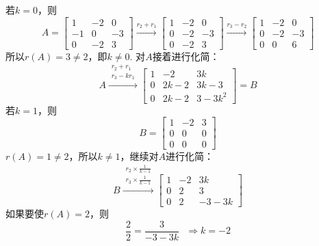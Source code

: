 \documentclass{article}
\begin{document}
\begin{jie}
若$k=0$，则
\begin{equation*}
A=\begin{bmatrix}
  1 & -2 & 0\\
 -1 & 0 & -3\\
 0 & -2 & 3
\end{bmatrix}
\xrightarrow{r_{2}+r_{1}}
{
\begin{bmatrix}
  1 & -2 & 0\\
 0 & -2 & -3\\
 0 & -2 & 3
\end{bmatrix}
}\xrightarrow{r_{3}-r_{2}}
{
\begin{bmatrix}
  1 & -2 & 0\\
 0 & -2 & -3\\
 0 & 0 & 6
\end{bmatrix}
}
\end{equation*}
所以$r(A)=3\neq2$，即$k\neq0$.
对$A$接着进行化简：
\begin{equation*}
  A\xrightarrow{\substack{r_{2}+r_{1} \\ r_{3}-kr_{1}}}
{
\begin{bmatrix}
  1 & -2 & 3k\\
 0 & 2k-2 & 3k-3\\
 0 & 2k-2 & 3-3k^{2}
\end{bmatrix}
}=B
\end{equation*}
若$k=1$，则
\begin{equation*}
B=
\begin{bmatrix}
  1 & -2 & 3\\
 0 & 0 & 0\\
 0 & 0 & 0
\end{bmatrix}
\end{equation*}
$r(A)=1\neq2$，所以$k\neq1$，继续对$A$进行化简：
\begin{equation*}
  B\xrightarrow{\substack{r_{2}\times\frac{1}{k-1} \\ r_{3}\times\frac{1}{k-1}}}
{
\begin{bmatrix}
  1 & -2 & 3k\\
 0 & 2 & 3\\
 0 & 2 & -3-3k
\end{bmatrix}
}
\end{equation*}
如果要使$r(A)=2$，则
\begin{equation*}
  \frac{2}{2}=\frac{3}{-3-3k}~~~\Rightarrow k=-2
\end{equation*}
\end{jie}
\end{document}
